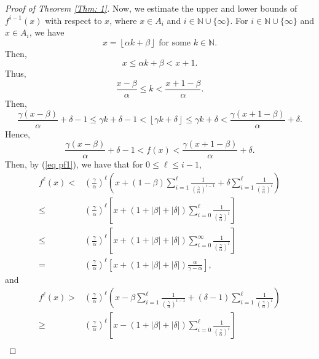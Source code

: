 \documentclass{amsart}
\theoremstyle{definition}
\numberwithin{equation}{section}%
\begin{document}
\begin{proof}[Proof of Theorem \ref{Thm: 1}]
Now, we estimate the upper and lower bounds of $f^{i-1}(x)$ with respect to $x$, where $x\in A_i$ and $ i\in \mathbb{N}\cup\{\infty\}$. For $ i\in \mathbb{N}\cup\{\infty\}$ and $x\in A_i$, we have
    \begin{equation*}
        x=\left\lfloor \alpha k+\beta \right\rfloor\mbox{ for some }k\in \mathbb{N}.
    \end{equation*}
Then,
\begin{equation*}
    x\leq \alpha k+\beta <x+1.
\end{equation*}
Thus,
\begin{equation*}
   \frac{x-\beta}{\alpha} \leq k <\frac{x+1-\beta}{\alpha}.
\end{equation*}
Then,
\begin{equation*}
   \frac{\gamma (x-\beta)}{\alpha}+\delta-1\leq \gamma k+\delta -1<  \left\lfloor \gamma k+\delta \right\rfloor\leq \gamma k+\delta <\frac{\gamma (x+1-\beta)}{\alpha}+\delta.
\end{equation*}
Hence,
\begin{equation}\label{eq pf1}
    \frac{\gamma (x-\beta)}{\alpha}+\delta-1 <f(x)<\frac{\gamma (x+1-\beta)}{\alpha}+\delta.
\end{equation}
Then, by (\ref{eq pf1}), we have that for $0\leq \ell\leq i-1$, 
    \begin{align*}
 f^\ell(x)<&\left(\frac{\gamma}{\alpha}\right)^\ell \left(x+(1-\beta)\sum_{i=1}^{\ell} \frac{1}{\left(\frac{\gamma}{\alpha}\right)^{i-1}}+\delta\sum_{i=1}^{\ell} \frac{1}{\left(\frac{\gamma}{\alpha}\right)^{i}}\right)\\
   \leq &\left(\frac{\gamma}{\alpha}\right)^\ell \left[x+(1+|\beta|+|\delta|)\sum_{i=0}^{\ell} \frac{1}{\left(\frac{\gamma}{\alpha}\right)^{i}}\right]\\
   \leq &\left(\frac{\gamma}{\alpha}\right)^\ell \left[x+(1+|\beta|+|\delta|)\sum_{i=0}^{\infty} \frac{1}{\left(\frac{\gamma}{\alpha}\right)^{i}}\right]\\
   =&\left(\frac{\gamma}{\alpha}\right)^\ell \left[x+(1+|\beta|+|\delta|)\frac{\alpha}{\gamma-\alpha}\right],
\end{align*}
and
  \begin{align*}
  f^\ell(x)>&\left(\frac{\gamma}{\alpha}\right)^\ell \left(x-\beta\sum_{i=1}^{\ell} \frac{1}{\left(\frac{\gamma}{\alpha}\right)^{i-1}}+(\delta-1)\sum_{i=1}^{\ell} \frac{1}{\left(\frac{\gamma}{\alpha}\right)^{i}}\right)\\
  \geq &\left(\frac{\gamma}{\alpha}\right)^\ell \left[x-(1+|\beta|+|\delta|)\sum_{i=0}^{\ell} \frac{1}{\left(\frac{\gamma}{\alpha}\right)^{i}}\right]\\

\end{align*}
\end{proof}
\end{document}
